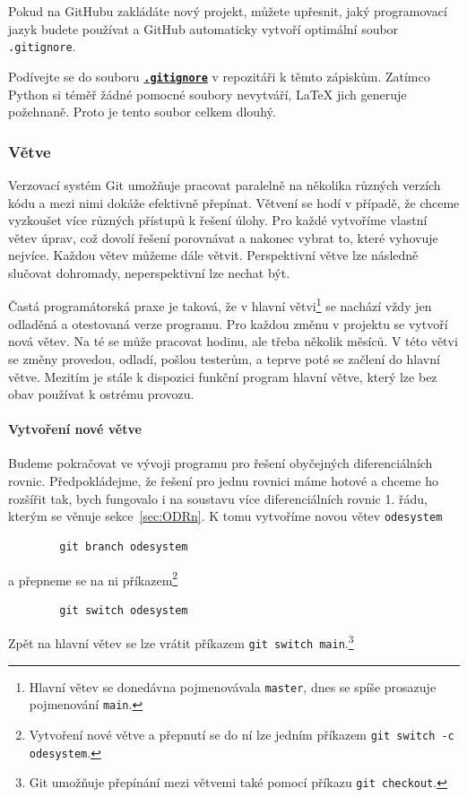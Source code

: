\documentclass[a4paper,11pt,twoside]{article}
\newcommand{\subsubsubsection}[1]{\paragraph{#1}\mbox{}

}
\def\code#1{\textnormal{\texttt{#1}}}
\def\ghfile#1#2{\textnormal{\textbf{\texttt{\href{https://github.com/PavelStransky/PCInPhysics2021/blob/main/#1#2}{#2}}}}}
\theoremstyle{red}
\theoremstyle{green}
\begin{document}
    Pokud na GitHubu zakládáte nový projekt, můžete upřesnit, jaký programovací jazyk budete používat a GitHub automaticky vytvoří optimální soubor \code{.gitignore}.

    \begin{voluntary}
        Podívejte se do souboru \ghfile{}{.gitignore} v repozitáři k těmto zápiskům.
        Zatímco Python si téměř žádné pomocné soubory nevytváří, {\LaTeX} jich generuje požehnaně.
        Proto je tento soubor celkem dlouhý. 
    \end{voluntary}

\subsubsection{Větve}
\label{sec:branches}
    Verzovací systém Git umožňuje pracovat paralelně na několika různých verzích kódu a mezi nimi dokáže efektivně přepínat.
    Větvení se hodí v případě, že chceme vyzkoušet více různých přístupů k řešení úlohy.
    Pro každé vytvoříme vlastní větev úprav, což dovolí řešení porovnávat a nakonec vybrat to, které vyhovuje nejvíce.
    Každou větev můžeme dále větvit.
    Perspektivní větve lze následně slučovat dohromady, neperspektivní lze nechat být.
    
    Častá programátorská praxe je taková, že v hlavní větvi\footnote{Hlavní větev se donedávna pojmenovávala \code{master}, dnes se spíše prosazuje pojmenování \code{main}.} se nachází vždy jen odladěná a otestovaná verze programu.
    Pro každou změnu v projektu se vytvoří nová větev.
    Na té se může pracovat hodinu, ale třeba několik měsíců.
    V této  větvi se změny provedou, odladí, pošlou testerům, a teprve poté se začlení do hlavní větve.
    Mezitím je stále k dispozici funkční program hlavní větve, který lze bez obav používat k ostrému provozu.

\subsubsubsection{Vytvoření nové větve}
    Budeme pokračovat ve vývoji programu pro řešení obyčejných diferenciálních rovnic.
    Předpokládejme, že řešení pro jednu rovnici máme hotové a chceme ho rozšířit tak, bych fungovalo i na soustavu více diferenciálních rovnic 1. řádu, kterým se věnuje sekce~\ref{sec:ODRn}.
    K tomu vytvoříme novou větev \code{odesystem}
    \begin{lstlisting}
        git branch odesystem\end{lstlisting}
    a přepneme se na ni příkazem\footnote{
        Vytvoření nové větve a přepnutí se do ní lze jedním příkazem \code{git switch -c odesystem}.
    }
    \begin{lstlisting}
        git switch odesystem\end{lstlisting}
        Zpět na hlavní větev se lze vrátit příkazem \code{git switch main}.\footnote{
            Git umožňuje přepínání mezi větvemi také pomocí příkazu \code{git checkout}.
        }
\end{document}
